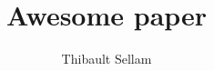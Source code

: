 \documentclass{acm_proc_article-sp}
\begin{document}
\title{Awesome paper}

\author{
\alignauthor
Thibault Sellam\\
       \\
\alignauthor
}

\maketitle


  
\balancecolumns
\end{document}
